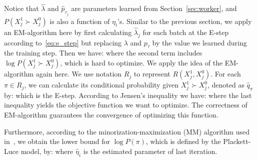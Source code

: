 Notice that $\hat{\lambda}$ and $\hat{p}_{\tau_j}$ are parameters learned from Section~\ref{sec:worker}, 
and $P(X_{j}^1 \succ X_{j}^0)$ is also a function of $\eta_{i}$'s.
Similar to the previous section, we apply an EM-algorithm here
by first calculating $\hat{\lambda}_j$ for each batch at the E-step 
according to~\eqref{eq:e_step}
but replacing $\lambda$ and $p_{\tau}$ by the value we learned during the training step.
Then we have:
%
where the second term includes $\log P(X_{j}^1 \succ X_{j}^0)$, which is hard to optimize.
We apply the idea of the EM-algorithm again here.
We use notation $R_j$ to represent $R(X_{j}^1, X_{j}^0)$.
For each $\pi \in R_j$, we can calculate its conditional probability given $X_{j}^1 \succ X_{j}^0$, denoted as $\hat{q}_{\pi}$ by:
%
which is the E-step.
According to Jensen's inequality we have:
%
where the last inequality yields the objective function we want to optimize.
The correctness of EM-algorithm guarantees the convergence of optimizing this function.




Furthermore, according to the minorization-maximization (MM) algorithm used in~\cite{hunter:aos2004},
we obtain the lower bound for $\log P(\pi)$, which is defined by the Plackett-Luce model, by:
%
where $\hat{\eta}_i$ is the estimated parameter of last iteration.



